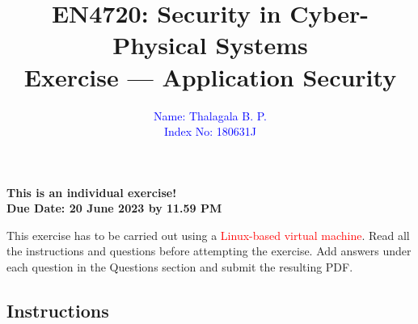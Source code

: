 \documentclass[11pt,letterpaper]{article}
\begin{document}
	
	\title{EN4720: Security in Cyber-Physical Systems \\ Exercise --- Application Security}
	
	\author{ \textcolor{blue}{Name: Thalagala B. P.} \\ \textcolor{blue}{Index No: 180631J}}
	
	\maketitle
	
	\begin{center}
		\color{red}\bf This is an individual exercise! \\ Due Date: 20 June 2023 by 11.59 PM
	\end{center}
	
	\vspace{1in}
	
	This exercise has to be carried out using a \textcolor{red}{Linux-based virtual machine}. Read all the instructions and questions before attempting the exercise. Add answers under each question in the Questions section and submit the resulting PDF.
	
	\subsection*{Instructions}
	
\end{document}
